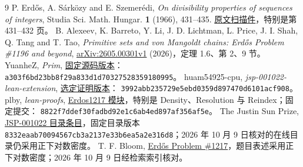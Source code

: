 \begin{thebibliography}{9}
\small
\setlength{\itemsep}{.45\baselineskip}
 P. Erd\H{o}s, A. S\'ark\"ozy and E. Szemer\'edi,
\emph{On divisibility properties of sequences of integers}, Studia Sci. Math. Hungar. \textbf{1} (1966), 431--435.
\href{https://users.renyi.hu/~p_erdos/1966-09.pdf}{原文扫描件}，特别是第 431--432 页。
 B. Alexeev, K. Barreto, Y. Li, J. D. Lichtman, L. Price, J. I. Shah, Q. Tang and T. Tao,
\emph{Primitive sets and von Mangoldt chains: Erd\H{o}s Problem \#1196 and beyond},
\href{https://arxiv.org/abs/2605.00301v1}{arXiv:2605.00301v1} (2026)，定理 1.6、第 2、9 节。
 YuanheZ, \emph{Prim},
\href{https://github.com/YuanheZ/Prim/tree/a303f6bd23bb8f29a833d1d70327528359180995}{固定源码版本}：
\nolinkurl{a303f6bd23bb8f29a833d1d70327528359180995}。
 huam54925-cpu, \emph{jsp-001022-lean-extension},
\href{https://github.com/huam54925-cpu/jsp-001022-lean-extension/tree/3992abb235729e5ebd0359d897470d6101acf908}{选定证明版本}：
\nolinkurl{3992abb235729e5ebd0359d897470d6101acf908}。
 plby, \emph{lean-proofs},
\href{https://github.com/plby/lean-proofs/tree/8822f7ddef30fadbd92e1c6ab4ed897af356af5e/src/latest/ErdosProblems/Erdos1217}{Erdos1217 模块}，特别是 Density、Resolution 与 Reindex；固定提交：
\nolinkurl{8822f7ddef30fadbd92e1c6ab4ed897af356af5e}。
 The Justin Sun Prize,
\href{https://github.com/TheJustinSunPrize/awards/blob/8332eaab70094567cb3a2137e33b6ea5a2e316d8/problems/catalog-1001-1022.md\#JSP-001022}{JSP-001022 目录条目}，固定目录版本 \nolinkurl{8332eaab70094567cb3a2137e33b6ea5a2e316d8}；2026 年 10 月 9 日核对的在线目录仍采用正下对数密度。
 T. F. Bloom,
\href{https://www.erdosproblems.com/1217}{Erd\H{o}s Problem \#1217}，题目表述采用正下对数密度；2026 年 10 月 9 日经检索索引核对。
\end{thebibliography}
